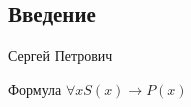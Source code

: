 \newpage
\begin{center}
\section*{Введение}	
\end{center}

Сергей Петрович 

Формула $\forall x S(x) \to P(x)$